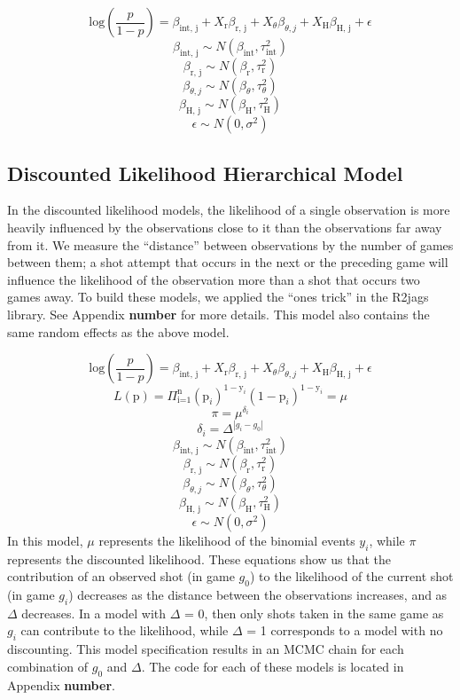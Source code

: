 \documentclass[12pt,twoside]{dukestatscithesis}
\theoremstyle{definition}
\theoremstyle{definition}
\theoremstyle{definition}
\theoremstyle{remark}
\begin{document}
\[
\text{log} \left( \frac{p}{1-p} \right) = 
\beta_{\text{int, j}} +
X_{\text{r}}\beta_{\text{r, j}} +
X_{\theta}\beta_{\theta, j} +
X_{\text{H}}\beta_{\text{H, j}} +
\epsilon
\] \[
\beta_{\text{int, j}} \sim N(\beta_{\text{int}}, \tau^2_{\text{int}})
\] \[
\beta_{\text{r, j}} \sim N(\beta_{\text{r}}, \tau^2_{\text{r}})
\] \[
\beta_{\theta, j} \sim N(\beta_{\theta}, \tau^2_{\theta})
\] \[
\beta_{\text{H, j}} \sim N(\beta_{\text{H}}, \tau^2_{\text{H}})
\] \[
\epsilon \sim N(0, \sigma^2)
\]

\subsection{Discounted Likelihood Hierarchical
Model}\label{discounted-likelihood-hierarchical-model}

In the discounted likelihood models, the likelihood of a single
observation is more heavily influenced by the observations close to it
than the observations far away from it. We measure the ``distance''
between observations by the number of games between them; a shot attempt
that occurs in the next or the preceding game will influence the
likelihood of the observation more than a shot that occurs two games
away. To build these models, we applied the ``ones trick'' in the R2jags
library. See Appendix \textbf{number} for more details. This model also
contains the same random effects as the above model.

\clearpage

\[
\text{log} \left( \frac{p}{1-p} \right) = 
\beta_{\text{int, j}} +
X_{\text{r}}\beta_{\text{r, j}} +
X_{\theta}\beta_{\theta, j} +
X_{\text{H}}\beta_{\text{H, j}} +
\epsilon
\] \[
L(\text{p}) = 
\Pi_{\text{i=1}}^\text{n}(\text{p}_i)^{1-\text{y}_i} (1 - \text{p}_i)^{1-\text{y}_i} = 
\mu 
\] \[
\pi = \mu^{\delta_i}
\] \[
\delta_i = \Delta^{|g_i - g_0|}
\] \[
\beta_{\text{int, j}} \sim N(\beta_{\text{int}}, \tau^2_{\text{int}})
\] \[
\beta_{\text{r, j}} \sim N(\beta_{\text{r}}, \tau^2_{\text{r}})
\] \[
\beta_{\theta, j} \sim N(\beta_{\theta}, \tau^2_{\theta})
\] \[
\beta_{\text{H, j}} \sim N(\beta_{\text{H}}, \tau^2_{\text{H}})
\] \[
\epsilon \sim N(0, \sigma^2)
\] In this model, \(\mu\) represents the likelihood of the binomial
events \(y_i\), while \(\pi\) represents the discounted likelihood.
These equations show us that the contribution of an observed shot (in
game \(g_0\)) to the likelihood of the current shot (in game \(g_i\))
decreases as the distance between the observations increases, and as
\(\Delta\) decreases. In a model with \(\Delta\) = 0, then only shots
taken in the same game as \(g_i\) can contribute to the likelihood,
while \(\Delta\) = 1 corresponds to a model with no discounting. This
model specification results in an MCMC chain for each combination of
\(g_0\) and \(\Delta\). The code for each of these models is located in
Appendix \textbf{number}.
\end{document}

